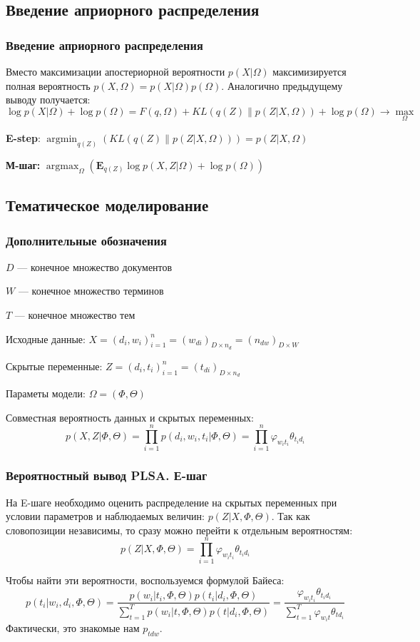 \documentclass[utf8]{beamer}
\DeclareMathOperator{\argmax}{argmax}
\DeclareMathOperator{\argmin}{argmin}
\renewcommand{\phi}{\varphi}
\begin{document}
	\subsection{Введение априорного распределения}
	\begin{frame}	
	\frametitle{Введение априорного распределения}
	Вместо максимизации апостериорной вероятности $p(X|\Omega)$ максимизируется полная  вероятность $p(X, \Omega)= p(X|\Omega) p(\Omega)$. Аналогично предыдущему выводу получается:
\[
\log p(X|\Omega) + \log p(\Omega) = F(q, \Omega) + KL(q(Z)\|p(Z|X,\Omega)) + \log p(\Omega) \to \max\limits_{\Omega}
\]

\textbf{E-step}: $\argmin_{q(Z)} \left( KL(q(Z)\|p(Z|X,\Omega))\right) = p(Z|X, \Omega)$

\medskip

\textbf{М-шаг:} $\argmax_{\Omega} \left( \mathbf{E}_{q(Z)} \log p(X, Z|\Omega) + \log p(\Omega)\right)$ 
	\end{frame}


	\subsection{Тематическое моделирование}

 	\begin{frame}
		\frametitle{Дополнительные обозначения}  
$D$ --- конечное множество документов
\smallskip

$W$  --- конечное множество терминов
\smallskip

$T$ --- конечное множество тем
\smallskip

Исходные данные:
$X = (d_i ,w_i)_{i=1}^n = (w_{di})_{D \times n_d} = (n_{dw})_{D \times W}$
\smallskip

Скрытые переменные:
$Z = (d_i , t_i)_{i=1}^n = (t_{di})_{D \times n_d}$
\smallskip

Параметы модели:
$\Omega = (\Phi, \Theta)$
\smallskip

Совместная вероятность данных и скрытых переменных:
\[
p(X, Z|\Phi, \Theta) =\prod\limits_{i=1}^{n} p(d_{i}, w_{i}, t_{i}|\Phi, \Theta) =\prod\limits_{i=1}^{n} \phi_{w_{i}t_{i}}\theta_{t_{i}d_{i}}
\]
	\end{frame}

	
 	\begin{frame}
		\frametitle{Вероятностный вывод PLSA. Е-шаг}   
На E-шаге необходимо оценить распределение на скрытых переменных при условии параметров и  наблюдаемых величин: $p(Z|X,\Phi,\Theta)$. Так как словопозиции независимы, то сразу можно перейти к отдельным вероятностям:
\[
p(Z|X,\Phi, \Theta) = \prod\limits_{i=1}^{n} \phi_{w_{i}t_{i}}\theta_{t_{i}d_{i}}
\]

Чтобы найти эти вероятности, воспользуемся формулой Байеса:
\[
p(t_{i}|w_{i}, d_{i}, \Phi, \Theta) = \frac{p(w_{i}|t_{i}, \Phi, \Theta)p(t_{i}|d_{i}, \Phi,\Theta)}{\sum_{t=1}^T p(w_{i}|t, \Phi, \Theta)p(t|d_{i}, \Phi,\Theta)}
= \frac{\phi_{w_{i} t_{i}} \theta_{t_{i} d_i}}{\sum_{t=1}^T \phi_{w_{i}t} \theta_{td_i}}
\]
Фактически, это знакомые нам $p_{tdw}$.
	\end{frame}
	
\end{document}
